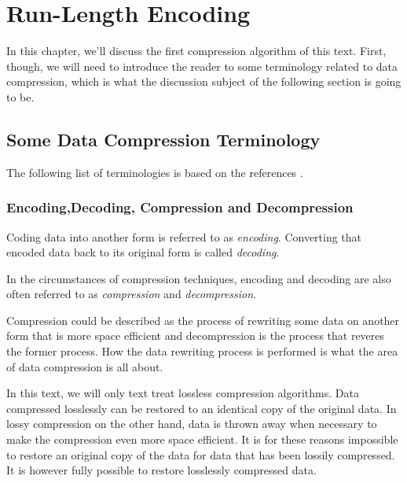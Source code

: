 \begin{comment}
  
\end{comment}

\chapter{Run-Length Encoding}
\label{cha:rle}

In this chapter, we'll discuss the first compression algorithm of this
text. First, though, we will need to introduce the reader to some
terminology related to data compression, which is what the discussion
subject of the following section is going to be.

\section{Some Data Compression Terminology}

The following list of terminologies is based on the references
\cite{Salomon:2004:DCC,mark1996data_compression_book,Bell:1989:MTC:76894.76896}.

\subsection{Encoding,Decoding, Compression and Decompression}

Coding data into another form is referred to as
\textit{encoding}. Converting that encoded data back
to its original form is called \textit{decoding}.

In the circumstances of compression techniques, encoding and decoding
are also often referred to as \textit{compression}
and \textit{decompression}.

Compression could be described as the process of rewriting some data
on another form that is more space efficient and decompression is the
process that reveres the former process. How the data rewriting
process is performed is what the area of data compression is all
about.

In this text, we will only text treat lossless compression
algorithms. Data compressed losslessly can be restored to an identical
copy of the original data. In lossy compression on the other hand,
data is thrown away when necessary to make the compression even more
space efficient. It is for these reasons impossible to restore an
original copy of the data for data that has been lossily
compressed. It is however fully possible to restore losslessly
compressed data.

